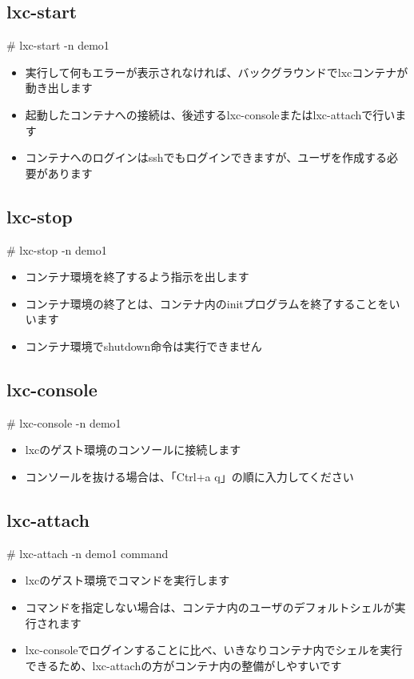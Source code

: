 \documentclass[mingoth,a4paper]{jsarticle}
\begin{document}
\subsection[containsverbatim]{lxc-start}
  \begin{commandline}
  # lxc-start -n demo1
  \end{commandline}
  \begin{itemize}
  \item 実行して何もエラーが表示されなければ、バックグラウンドでlxcコンテナが動き出します
  \item 起動したコンテナへの接続は、後述するlxc-consoleまたはlxc-attachで行います
  \item コンテナへのログインはsshでもログインできますが、ユーザを作成する必要があります
  \end{itemize}


\subsection[containsverbatim]{lxc-stop}
  \begin{commandline}
  # lxc-stop -n demo1
  \end{commandline}
  \begin{itemize}
  \item コンテナ環境を終了するよう指示を出します
  \item コンテナ環境の終了とは、コンテナ内のinitプログラムを終了することをいいます
  \item コンテナ環境でshutdown命令は実行できません
  \end{itemize}


\subsection[containsverbatim]{lxc-console}
  \begin{commandline}
  # lxc-console -n demo1
  \end{commandline}
  \begin{itemize}
  \item lxcのゲスト環境のコンソールに接続します
  \item コンソールを抜ける場合は、「Ctrl+a q」の順に入力してください
  \end{itemize}


\subsection[containsverbatim]{lxc-attach}
  \begin{commandline}
  # lxc-attach -n demo1 {command}
  \end{commandline}
  \begin{itemize}
  \item lxcのゲスト環境でコマンドを実行します
  \item コマンドを指定しない場合は、コンテナ内のユーザのデフォルトシェルが実行されます
  \item lxc-consoleでログインすることに比べ、いきなりコンテナ内でシェルを実行できるため、lxc-attachの方がコンテナ内の整備がしやすいです
  \end{itemize}
\end{document}
